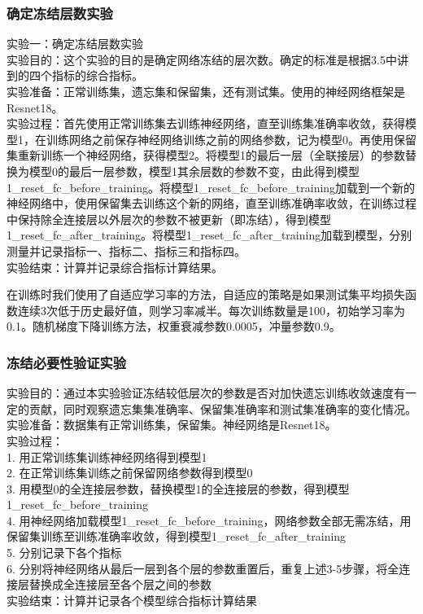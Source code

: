 \subsubsection{确定冻结层数实验}
实验一：确定冻结层数实验
\\实验目的：这个实验的目的是确定网络冻结的层次数。确定的标准是根据3.5中讲到的四个指标的综合指标。
\\实验准备：正常训练集，遗忘集和保留集，还有测试集。使用的神经网络框架是Resnet18。
\\实验过程：首先使用正常训练集去训练神经网络，直至训练集准确率收敛，获得模型1，在训练网络之前保存神经网络训练之前的网络参数，记为模型0。再使用保留集重新训练一个神经网络，获得模型2。将模型1的最后一层（全联接层）的参数替换为模型0的最后一层参数，模型1其余层数的参数不变，由此得到模型1\_reset\_fc\_before\_training。将模型1\_reset\_fc\_before\_training加载到一个新的神经网络中，使用保留集去训练这个新的网络，直至训练准确率收敛，在训练过程中保持除全连接层以外层次的参数不被更新（即冻结），得到模型1\_reset\_fc\_after\_training。将模型1\_reset\_fc\_after\_training加载到模型，分别测量并记录指标一、指标二、指标三和指标四。
\\实验结束：计算并记录综合指标计算结果。

在训练时我们使用了自适应学习率的方法，自适应的策略是如果测试集平均损失函数连续3次低于历史最好值，则学习率减半。每次训练数量是100，初始学习率为0.1。随机梯度下降训练方法，权重衰减参数0.0005，冲量参数0.9。

\subsubsection{冻结必要性验证实验}
实验目的：通过本实验验证冻结较低层次的参数是否对加快遗忘训练收敛速度有一定的贡献，同时观察遗忘集集准确率、保留集准确率和测试集准确率的变化情况。
\\实验准备：数据集有正常训练集，保留集。神经网络是Resnet18。
\\实验过程：
\\1. 用正常训练集训练神经网络得到模型1
\\2. 在正常训练集训练之前保留网络参数得到模型0
\\3. 用模型0的全连接层参数，替换模型1的全连接层的参数，得到模型1\_reset\_fc\_before\_training
\\4. 用神经网络加载模型1\_reset\_fc\_before\_training，网络参数全部无需冻结，用保留集训练至训练准确率收敛，得到模型1\_reset\_fc\_after\_training
\\5. 分别记录下各个指标
\\6. 分别将神经网络从最后一层到各个层的参数重置后，重复上述3-5步骤，将全连接层替换成全连接层至各个层之间的参数
\\实验结束：计算并记录各个模型综合指标计算结果
